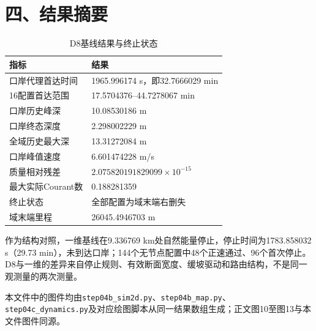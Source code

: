 \documentclass[11pt,a4paper]{ctexart}
\begin{document}
\section*{四、结果摘要}
\begin{table}[H]\centering\small
\caption{D8基线结果与终止状态}\label{tab:summary}
\begin{tabular}{@{}l l@{}}
\toprule
指标&结果\\
\midrule
口岸代理首达时间&1965.996174 s，即32.7666029 min\\
16配置首达范围&17.5704376--44.7278067 min\\
口岸历史峰深&10.08530186 m\\
口岸终态深度&2.298002229 m\\
全域历史最大深&13.31272084 m\\
口岸峰值速度&6.601474228 m/s\\
质量相对残差&$2.075820191829099\times10^{-15}$\\
最大实际Courant数&0.188281359\\
终止状态&全部配置为域末端右删失\\
域末端里程&26045.4946703 m\\
\bottomrule
\end{tabular}
\end{table}

作为结构对照，一维基线在9.336769 km处自然能量停止，停止时间为1783.858032 s（29.73 min），未到达口岸；144个无节点配置中48个正速通过、96个首次停止。D8与一维的差异来自停止规则、有效断面宽度、缓坡驱动和路由结构，不是同一观测量的两次测量。

本文件中的图件均由\texttt{step04b\_sim2d.py}、\texttt{step04b\_map.py}、\texttt{step04c\_dynamics.py}及对应绘图脚本从同一结果数组生成；正文图10至图13与本文件图件同源。
\end{document}
